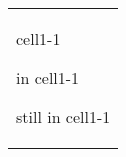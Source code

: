 \label{\detokenize{tabular:list-table-with-cell-having-three-paragraphs}}

\begin{savenotes}\sphinxattablestart
\centering
\begin{tabulary}{\linewidth}[t]{|T|}
\hline 
{}\relax \\
\hline cell1-1

in cell1-1

still in cell1-1
\\
\hline 
\end{tabulary}
\par
\sphinxattableend\end{savenotes}
